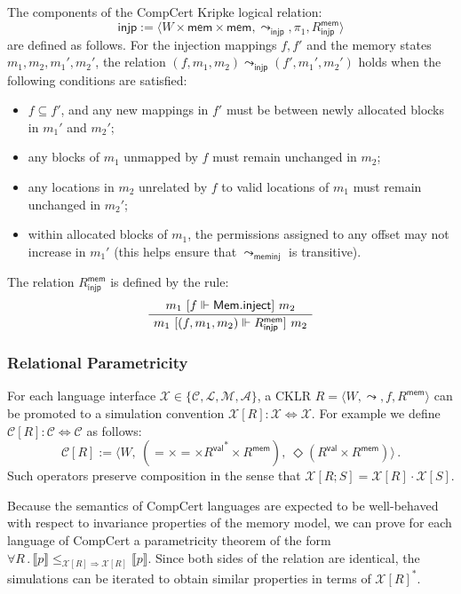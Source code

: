 \documentclass[acmsmall,timestamp,review,anonymous]{acmart}
\newcommand{\kw}[1]{\ensuremath{ \mathsf{#1} }}
\newcommand{\ifr}[1]{\ [{#1}]\ }
\begin{document}
\begin{definition}
The components of the CompCert Kripke logical relation:
\[ \kw{injp} :=
  \langle
    W \times \kw{mem} \times \kw{mem},
    \leadsto_\kw{injp}, \pi_1, R_\kw{injp}^\kw{mem}
  \rangle \]
are defined as follows.
For the injection mappings $f, f'$ and
the memory states $m_1, m_2, m_1', m_2'$,
the relation $(f, m_1, m_2) \leadsto_\kw{injp} (f', m_1', m_2')$
holds when the following conditions are satisfied:
\begin{itemize}
\item $f \subseteq f'$, and any new mappings in $f'$
  must be between newly allocated blocks in $m_1'$ and $m_2'$;
\item any blocks of $m_1$ unmapped by $f$
  must remain unchanged in $m_2$;
\item any locations in $m_2$ unrelated by $f$
  to valid locations of $m_1$ must remain unchanged in $m_2'$;
\item within allocated blocks of $m_1$,
  the permissions assigned to any offset may not increase in $m_1'$
  (this helps ensure that $\leadsto_\kw{meminj}$ is transitive).
\end{itemize}
The relation $R_\kw{injp}^\kw{mem}$ is defined by the rule:
\[
  \AxiomC{$m_1 \ifr{f \Vdash \kw{Mem.inject}} m_2$}
  \UnaryInfC{$m_1 \ifr{(f, m_1, m_2) \Vdash R_\kw{injp}^\kw{mem}} m_2$}
  \DisplayProof
\]
\end{definition}


\subsubsection{Relational Parametricity} \label{sec:compcert:param} %

For each language interface
$\mathcal{X} \in \{ \mathcal{C}, \mathcal{L}, \mathcal{M}, \mathcal{A} \}$,
a CKLR
$R = \langle W, {\leadsto}, f, R^\kw{mem} \rangle$ can be promoted to
a simulation convention
$\mathcal{X}[R] : \mathcal{X} \Leftrightarrow \mathcal{X}$.
For example
we define $\mathcal{C}[R] : \mathcal{C} \Leftrightarrow \mathcal{C}$
as follows:
\[
    \mathcal{C}[R] := \langle
      W, \:
      ({=} \times {=} \times {R^\kw{val}}^* \times R^\kw{mem}), \:
      \Diamond (R^\kw{val} \times R^\kw{mem})
    \rangle \,.
\]
Such operators preserve composition
in the sense that $\mathcal{X}[R ; S] = \mathcal{X}[R] \cdot \mathcal{X}[S]$.

Because the semantics of CompCert languages
are expected to be well-behaved with respect to
invariance properties of the memory model,
we can prove for each language of CompCert
a parametricity theorem of the form
$
    \forall R \,.\,
      \llbracket p \rrbracket
        \le_{\mathcal{X}[R] \Rightarrow \mathcal{X}[R]}
      \llbracket p \rrbracket
$.
Since both sides of the relation are identical,
the simulations can be iterated
to obtain similar properties in terms of $\mathcal{X}[R]^*$.
\end{document}
